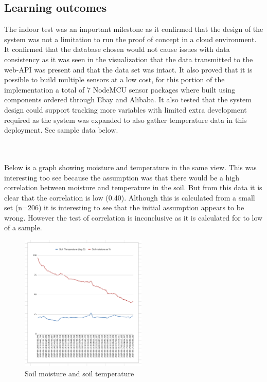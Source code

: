 \documentclass[]{uiophd}
\begin{document}
\subsection{Learning outcomes}
The indoor test was an important milestone as it confirmed that the design of the system was not a limitation to run the proof of concept in a cloud environment. It confirmed that the database chosen would not cause issues with data consistency as it was seen in the visualization that the data transmitted to the web-API was present and that the data set was intact. It also proved that it is possible to build multiple sensors at a low cost, for this portion of the implementation a total of 7 NodeMCU sensor packages where built using components ordered through Ebay and Alibaba. It also tested that the system design could support tracking more variables with limited extra development required as the system was expanded to also gather temperature data in this deployment. See sample data below.


\\\\
Below is a graph showing moisture and temperature in the same view. This was interesting too see because the assumption was that there would be a high correlation between moisture and temperature in the soil. But from this data it is clear that the correlation is low (0.40). Although this is calculated from a small set (n=206) it is interesting to see that the initial assumption appears to be wrong. However the test of correlation is inconclusive as it is calculated for to low of a sample.


 \begin{figure}[h]
\caption{Soil moisture and soil temperature }
\centering
\includegraphics[width=6cm]{moistureandtemp.png}
\end{figure}
\end{document}
